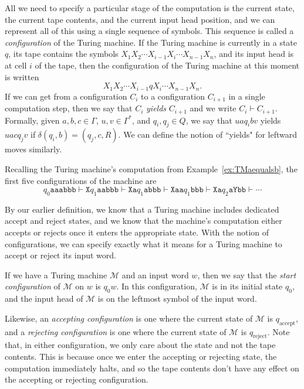 All we need to specify a particular stage of the computation is the current state, the current tape contents, and the current input head position, and we can represent all of this using a single sequence of symbols. This sequence is called a \emph{configuration} of the Turing machine. If the Turing machine is currently in a state $q$, its tape contains the symbols $X_{1}X_{2} \cdots X_{i-1}X_{i} \cdots X_{n-1}X_{n}$, and its input head is at cell $i$ of the tape, then the configuration of the Turing machine at this moment is written
\begin{equation*}
X_{1}X_{2} \cdots X_{i-1}qX_{i} \cdots X_{n-1}X_{n}.
\end{equation*}
If we can get from a configuration $C_{i}$ to a configuration $C_{i+1}$ in a single computation step, then we say that $C_{i}$ \emph{yields} $C_{i+1}$ and we write $C_{i} \vdash C_{i+1}$. Formally, given $a, b, c \in \Gamma$, $u, v \in \Gamma^{*}$, and $q_{i}, q_{j} \in Q$, we say that $uaq_{i}bv$ yields $uacq_{j}v$ if $\delta(q_{i}, b) = (q_{j}, c, R)$. We can define the notion of ``yields" for leftward moves similarly.

\begin{example}
Recalling the Turing machine's computation from Example~\ref{ex:TMaequalsb}, the first five configurations of the machine are
\begin{equation*}
q_{0}\texttt{aaabbb} \vdash \texttt{X}q_{1}\texttt{aabbb} \vdash \texttt{Xa}q_{1}\texttt{abbb} \vdash \texttt{Xaa}q_{1}\texttt{bbb} \vdash \texttt{Xa}q_{2}\texttt{aYbb} \vdash \cdots
\end{equation*}
\end{example}

By our earlier definition, we know that a Turing machine includes dedicated accept and reject states, and we know that the machine's computation either accepts or rejects once it enters the appropriate state. With the notion of configurations, we can specify exactly what it means for a Turing machine to accept or reject its input word.

If we have a Turing machine $\mathcal{M}$ and an input word $w$, then we say that the \emph{start configuration} of $\mathcal{M}$ on $w$ is $q_{0}w$. In this configuration, $\mathcal{M}$ is in its initial state $q_{0}$, and the input head of $\mathcal{M}$ is on the leftmost symbol of the input word.

Likewise, an \emph{accepting configuration} is one where the current state of $\mathcal{M}$ is $q_{\text{accept}}$, and a \emph{rejecting configuration} is one where the current state of $\mathcal{M}$ is $q_{\text{reject}}$. Note that, in either configuration, we only care about the state and not the tape contents. This is because once we enter the accepting or rejecting state, the computation immediately halts, and so the tape contents don't have any effect on the accepting or rejecting configuration.

